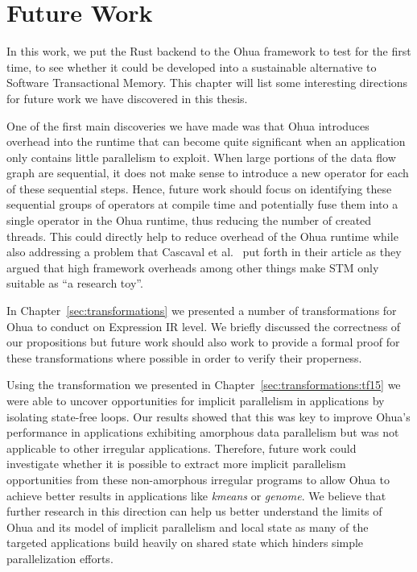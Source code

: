 %
\chapter{Future Work}
\label{sec:future}

In this work, we put the Rust backend to the Ohua framework to test for the first time, to see whether it could be developed into a sustainable alternative to Software Transactional Memory.
This chapter will list some interesting directions for future work we have discovered in this thesis.

One of the first main discoveries we have made was that Ohua introduces overhead into the runtime that can become quite significant when an application only contains little parallelism to exploit.
When large portions of the data flow graph are sequential, it does not make sense to introduce a new operator for each of these sequential steps.
Hence, future work should focus on identifying these sequential groups of operators at compile time and potentially fuse them into a single operator in the Ohua runtime, thus reducing the number of created threads.
This could directly help to reduce overhead of the Ohua runtime while also addressing a problem that Cascaval et al.~\cite{cascaval2008software} put forth in their article as they argued that high framework overheads among other things make STM only suitable as \enquote{a research toy}.

In Chapter~\ref{sec:transformations} we presented a number of transformations for Ohua to conduct on Expression IR level.
We briefly discussed the correctness of our propositions but future work should also work to provide a formal proof for these transformations where possible in order to verify their properness.

Using the transformation we presented in Chapter~\ref{sec:transformations:tf15} we were able to uncover opportunities for implicit parallelism in applications by isolating state-free loops.
Our results showed that this was key to improve Ohua's performance in applications exhibiting amorphous data parallelism but was not applicable to other irregular applications.
Therefore, future work could investigate whether it is possible to extract more implicit parallelism opportunities from these non-amorphous irregular programs to allow Ohua to achieve better results in applications like \emph{kmeans} or \emph{genome}.
We believe that further research in this direction can help us better understand the limits of Ohua and its model of implicit parallelism and local state as many of the targeted applications build heavily on shared state which hinders simple parallelization efforts.

